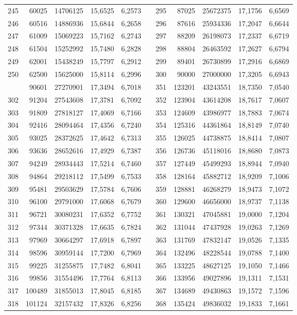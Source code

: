 \begin{longtable}{rrrrrrrrrrr}
245&60025&14706125&15,6525&6,2573&&295&87025&25672375&17,1756&6,6569\\
246&60516&14886936&15,6844&6,2658&&296&87616&25934336&17,2047&6,6644\\
247&61009&15069223&15,7162&6,2743&&297&88209&26198073&17,2337&6,6719\\
248&61504&15252992&15,7480&6,2828&&298&88804&26463592&17,2627&6,6794\\
249&62001&15438249&15,7797&6,2912&&299&89401&26730899&17,2916&6,6869\\
250&62500&15625000&15,8114&6,2996&&300&90000&27000000&17,3205&6,6943\\
\newpage
301&90601&27270901&17,3494&6,7018&&351&123201&43243551&18,7350&7,0540\\
302&91204&27543608&17,3781&6,7092&&352&123904&43614208&18,7617&7,0607\\
303&91809&27818127&17,4069&6,7166&&353&124609&43986977&18,7883&7,0674\\
304&92416&28094464&17,4356&6,7240&&354&125316&44361864&18,8149&7,0740\\
305&93025&28372625&17,4642&6,7313&&355&126025&44738875&18,8414&7,0807\\
306&93636&28652616&17,4929&6,7387&&356&126736&45118016&18,8680&7,0873\\
307&94249&28934443&17,5214&6,7460&&357&127449&45499293&18,8944&7,0940\\
308&94864&29218112&17,5499&6,7533&&358&128164&45882712&18,9209&7,1006\\
309&95481&29503629&17,5784&6,7606&&359&128881&46268279&18,9473&7,1072\\
310&96100&29791000&17,6068&6,7679&&360&129600&46656000&18,9737&7,1138\\
311&96721&30080231&17,6352&6,7752&&361&130321&47045881&19,0000&7,1204\\
312&97344&30371328&17,6635&6,7824&&362&131044&47437928&19,0263&7,1269\\
313&97969&30664297&17,6918&6,7897&&363&131769&47832147&19,0526&7,1335\\
314&98596&30959144&17,7200&6,7969&&364&132496&48228544&19,0788&7,1400\\
315&99225&31255875&17,7482&6,8041&&365&133225&48627125&19,1050&7,1466\\
316&99856&31554496&17,7764&6,8113&&366&133956&49027896&19,1311&7,1531\\
317&100489&31855013&17,8045&6,8185&&367&134689&49430863&19,1572&7,1596\\
318&101124&32157432&17,8326&6,8256&&368&135424&49836032&19,1833&7,1661\\

\end{longtable}
